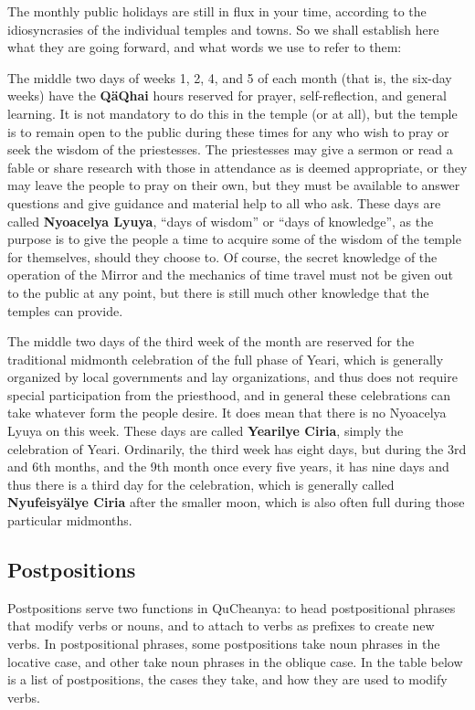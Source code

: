 \documentclass{article}
\begin{document}
The monthly public holidays are still in flux in your time, according to the idiosyncrasies of the individual temples and towns.  So we shall establish here what they are going forward, and what words we use to refer to them:

The middle two days of weeks 1, 2, 4, and 5 of each month (that is, the six-day weeks) have the \textbf{Q\"aQhai} hours reserved for prayer, self-reflection, and general learning.  It is not mandatory to do this in the temple (or at all), but the temple is to remain open to the public during these times for any who wish to pray or seek the wisdom of the priestesses.  The priestesses may give a sermon or read a fable or share research with those in attendance as is deemed appropriate, or they may leave the people to pray on their own, but they must be available to answer questions and give guidance and material help to all who ask.  These days are called \textbf{Nyoacelya Lyuya}, ``days of wisdom'' or ``days of knowledge'', as the purpose is to give the people a time to acquire some of the wisdom of the temple for themselves, should they choose to.  Of course, the secret knowledge of the operation of the Mirror and the mechanics of time travel must not be given out to the public at any point, but there is still much other knowledge that the temples can provide.

The middle two days of the third week of the month are reserved for the traditional midmonth celebration of the full phase of Yeari, which is generally organized by local governments and lay organizations, and thus does not require special participation from the priesthood, and in general these celebrations can take whatever form the people desire.  It does mean that there is no Nyoacelya Lyuya on this week.  These days are called \textbf{Yearilye Ciria}, simply the celebration of Yeari.  Ordinarily, the third week has eight days, but during the 3rd and 6th months, and the 9th month once every five years, it has nine days and thus there is a third day for the celebration, which is generally called \textbf{Nyufeisy\"alye Ciria} after the smaller moon, which is also often full during those particular midmonths.

\subsection{Postpositions}
\label{postpositions}

Postpositions serve two functions in QuCheanya: to head postpositional phrases that modify verbs or nouns, and to attach to verbs as prefixes to create new verbs.  In postpositional phrases, some postpositions take noun phrases in the locative case, and other take noun phrases in the oblique case.  In the table below is a list of postpositions, the cases they take, and how they are used to modify verbs.
\end{document}

